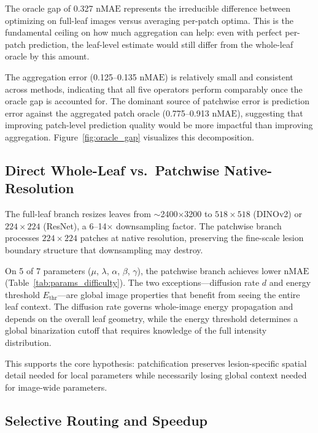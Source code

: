 \documentclass[11pt,a4paper]{article}
\newcommand{\nMAE}{\mathrm{nMAE}}
\begin{document}
The oracle gap of 0.327 $\nMAE$ represents the irreducible difference between optimizing on full-leaf images versus averaging per-patch optima.
This is the fundamental ceiling on how much aggregation can help: even with perfect per-patch prediction, the leaf-level estimate would still differ from the whole-leaf oracle by this amount.

The aggregation error (0.125--0.135 $\nMAE$) is relatively small and consistent across methods, indicating that all five operators perform comparably once the oracle gap is accounted for.
The dominant source of patchwise error is prediction error against the aggregated patch oracle (0.775--0.913 $\nMAE$), suggesting that improving patch-level prediction quality would be more impactful than improving aggregation.
Figure~\ref{fig:oracle_gap} visualizes this decomposition.


\subsection{Direct Whole-Leaf vs.\ Patchwise Native-Resolution}
\label{sec:direct}

The full-leaf branch resizes leaves from $\sim$2400$\times$3200 to $518 \times 518$ (DINOv2) or $224 \times 224$ (ResNet), a 6--14$\times$ downsampling factor.
The patchwise branch processes $224 \times 224$ patches at native resolution, preserving the fine-scale lesion boundary structure that downsampling may destroy.

On 5 of 7 parameters ($\mu$, $\lambda$, $\alpha$, $\beta$, $\gamma$), the patchwise branch achieves lower $\nMAE$ (Table~\ref{tab:params_difficulty}).
The two exceptions---diffusion rate $d$ and energy threshold $E_\mathrm{thr}$---are global image properties that benefit from seeing the entire leaf context.
The diffusion rate governs whole-image energy propagation and depends on the overall leaf geometry, while the energy threshold determines a global binarization cutoff that requires knowledge of the full intensity distribution.

This supports the core hypothesis: patchification preserves lesion-specific spatial detail needed for local parameters while necessarily losing global context needed for image-wide parameters.


\subsection{Selective Routing and Speedup}
\label{sec:routing}
\end{document}

